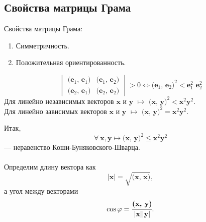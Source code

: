 \subsection{Свойства матрицы Грама}
Свойства матрицы Грама:
\begin{enumerate}
	\item Симметричность.
	\item Положительная ориентированность.
\end{enumerate}
\[
\begin{vmatrix}
\textbf {(e$_1$, e$_1$)} & \textbf {(e$_1$, e$_2$)} \\
\textbf {(e$_2$, e$_1$)} & \textbf {(e$_2$, e$_2$)}
\end{vmatrix}
> 0 \Leftrightarrow \textbf{(e$_1$, e$_2$)}^{2} < \textbf{e$_1^2$ e$_2^2$}
\]
Для линейно независимых векторов $\textbf{x}$ и $\textbf{y}$ $\longmapsto$ $\textbf{(x, y)}^{2} < \textbf{x}^{2} \textbf{y}^{2}.$ \\
Для линейно зависимых векторов $\textbf{x}$ и $\textbf{y}$ $\longmapsto$ $\textbf{(x, y)}^{2} = \textbf{x}^{2} \textbf{y}^{2}.$

Итак,
$$\boxed {\forall~ \textbf{x}, \textbf{y} \longmapsto \textbf{(x, y)}^{2} \le \textbf{x}^{2} \textbf{y}^{2}}$$ --- неравенство Коши-Буняковского-Шварца.
\\\\
Определим длину вектора как $$|\textbf{x}| = \sqrt {\textbf{(x, x)}},$$
а угол между векторами
$$\cos \varphi = \cfrac{\textbf{(x, y)}}{|\textbf{x}||\textbf{y}|}.$$
